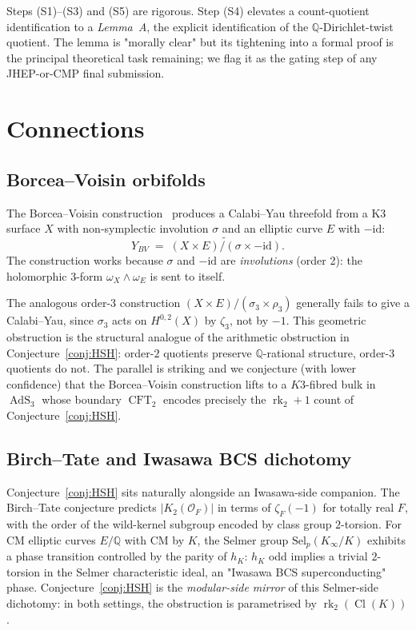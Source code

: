 \documentclass[11pt,a4paper]{amsart}
\theoremstyle{definition}
\DeclareMathOperator{\Cl}{Cl}
\DeclareMathOperator{\rk}{rk}
\DeclareMathOperator{\AdS}{AdS}
\DeclareMathOperator{\CFT}{CFT}
\newcommand{\Q}{\mathbb{Q}}
\newcommand{\Ocal}{\mathcal{O}}
\newcommand{\hK}{h_{K}}
\newcommand{\rktwo}{\rk_{2}}
\begin{document}
Steps (S1)--(S3) and (S5) are rigorous. Step (S4) elevates a count-quotient
identification to a \emph{Lemma~A}, the explicit identification of the
$\Q$-Dirichlet-twist quotient. The lemma is "morally clear" but its tightening into a
formal proof is the principal theoretical task remaining; we flag it as the gating step
of any JHEP-or-CMP final submission.

\section{Connections}\label{sec:connections}

\subsection{Borcea--Voisin orbifolds}\label{ss:Borcea-Voisin}

The Borcea--Voisin construction~\cite{Borcea1997, Voisin1993} produces a Calabi--Yau
threefold from a K3 surface $X$ with non-symplectic involution $\sigma$ and an elliptic
curve $E$ with $-\mathrm{id}$:
\[
  Y_{BV} \;=\; \widetilde{(X \times E)/(\sigma \times -\mathrm{id})}.
\]
The construction works because $\sigma$ and $-\mathrm{id}$ are \emph{involutions} (order 2):
the holomorphic 3-form $\omega_X \wedge \omega_E$ is sent to itself.

The analogous order-3 construction $(X \times E)/(\sigma_3 \times \rho_3)$ generally
fails to give a Calabi--Yau, since $\sigma_3$ acts on $H^{0,2}(X)$ by $\zeta_3$, not by
$-1$. This geometric obstruction is the structural analogue of the arithmetic
obstruction in Conjecture~\ref{conj:HSH}: order-$2$ quotients preserve $\Q$-rational
structure, order-$3$ quotients do not. The parallel is striking and we conjecture (with
lower confidence) that the Borcea--Voisin construction lifts to a $K3$-fibred bulk in
$\AdS_3$ whose boundary $\CFT_2$ encodes precisely the $\rktwo + 1$ count of
Conjecture~\ref{conj:HSH}.

\subsection{Birch--Tate and Iwasawa BCS dichotomy}\label{ss:BirchTate}

Conjecture~\ref{conj:HSH} sits naturally alongside an Iwasawa-side companion. The
Birch--Tate conjecture predicts $|K_2(\Ocal_F)|$ in terms of $\zeta_F(-1)$ for totally
real $F$, with the order of the wild-kernel subgroup encoded by class group $2$-torsion.
For CM elliptic curves $E/\Q$ with CM by $K$, the Selmer group $\mathrm{Sel}_p(K_\infty/K)$
exhibits a phase transition controlled by the parity of $\hK$: $\hK$ odd implies a
trivial $2$-torsion in the Selmer characteristic ideal, an "Iwasawa BCS superconducting"
phase. Conjecture~\ref{conj:HSH} is the \emph{modular-side mirror} of this Selmer-side
dichotomy: in both settings, the obstruction is parametrised by $\rktwo(\Cl(K))$.
\end{document}
